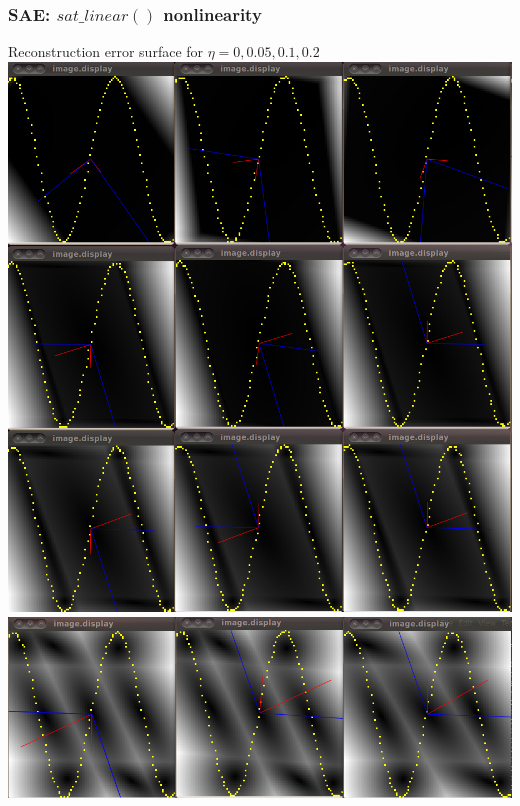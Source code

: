 \documentclass{beamer}
\begin{document}
\begin{frame}
\frametitle{SAE: $sat\_linear()$ nonlinearity} 
\begin{center} 
Reconstruction error surface for $\eta = 0, 0.05, 0.1, 0.2$ 
\includegraphics[scale = 0.15]{sat_linear_result0to02.png}\\
\includegraphics[scale = 0.15]{sat_linear_result03.png}
\end{center} 
\end{frame} 
\end{document}
